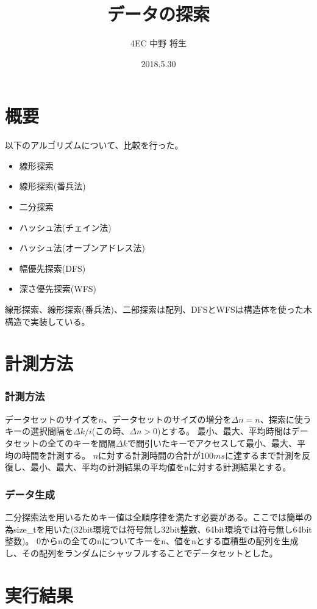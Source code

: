 \documentclass[dvipdfmx]{jsarticle}
\author{4EC 中野 将生}
\date{2018.5.30}
\title{データの探索}
\begin{document}
	\maketitle
	\section{概要}
		以下のアルゴリズムについて、比較を行った。
		\begin{itemize}
			\item 線形探索
			\item 線形探索(番兵法)
			\item 二分探索
			\item ハッシュ法(チェイン法)
			\item ハッシュ法(オープンアドレス法)
			\item 幅優先探索(DFS)
			\item 深さ優先探索(WFS)
		\end{itemize}
		線形探索、線形探索(番兵法)、二部探索は配列、DFSとWFSは構造体を使った木構造で実装している。
	\section{計測方法}
		\subsubsection{計測方法}
			データセットのサイズを$n$、データセットのサイズの増分を$\Delta n = n$、探索に使うキーの選択間隔を$\Delta k/i$(この時、$\Delta n > 0$)とする。
			最小、最大、平均時間はデータセットの全てのキーを間隔$\Delta k$で間引いたキーでアクセスして最小、最大、平均の時間を計測する。
			$n$に対する計測時間の合計が$100 ms$に達するまで計測を反復し、最小、最大、平均の計測結果の平均値をnに対する計測結果とする。
		\subsubsection{データ生成}
			二分探索法を用いるためキー値は全順序律を満たす必要がある。ここでは簡単の為size_tを用いた(32bit環境では符号無し32bit整数、64bit環境では符号無し64bit整数)。
			0からnの全てのnについてキーをn、値をnとする直積型の配列を生成し、その配列をランダムにシャッフルすることでデータセットとした。
	\section{実行結果}
\end{document}
